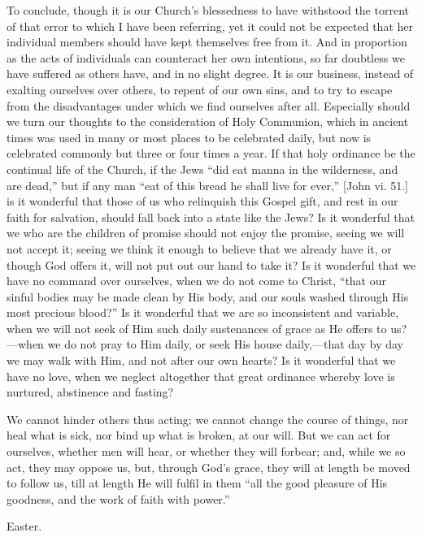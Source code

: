 To conclude, though it is our Church's blessedness to have
withstood the torrent of that error to which I have been referring,
yet it could not be expected that her individual members should have
kept themselves free from it. And in proportion as the acts of
individuals can counteract her own intentions, so far doubtless we
have suffered as others have, and in no slight degree. It is our
business, instead of exalting ourselves over others, to repent of our
own sins, and to try to escape from the disadvantages under which we
find ourselves after all. Especially should we turn our thoughts to
the consideration of Holy Communion, which in ancient times was used
in many or most places to be celebrated daily, but now is celebrated
commonly but three or four times a year. If that holy ordinance be the
continual life of the Church, if the Jews ``did eat manna in the
wilderness, and are dead,'' but if any man ``eat of this bread
he shall live for ever,'' [John vi. 51.] is it wonderful that
those of us who relinquish this Gospel gift, and rest in our faith for
salvation, should fall back into a state like the Jews? Is it
wonderful that we who are the children of promise should not enjoy the
promise, seeing we will not accept it; seeing we think it enough to
believe that we already have it, or though God offers it, will not put
out our hand to take it? Is it wonderful that we have no command over
ourselves, when we do not come to Christ, ``that our sinful bodies
may be made clean by His body, and our souls washed through His most
precious blood?'' Is it wonderful that we are so inconsistent and
variable, when we will not seek of Him such daily sustenances of grace
as He offers to us?—when we do not pray to Him daily, or seek His
house daily,—that day by day we may walk with Him, and not after our
own hearts? Is it wonderful that we have no love, when we neglect
altogether that great ordinance whereby love is nurtured, abstinence
and fasting?

We cannot hinder others thus acting; we cannot change the course of
things, nor heal what is sick, nor bind up what is broken, at our
will. But we can act for ourselves, whether men will hear, or whether
they will forbear; and, while we so act, they may oppose us, but,
through God's grace, they will at length be moved to follow us, till
at length He will fulfil in them ``all the good pleasure of His
goodness, and the work of faith with power.''


Easter.

